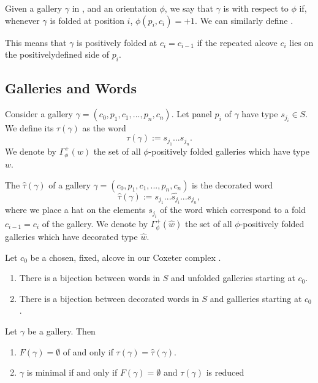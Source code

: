 \documentclass[11pt]{article}
\begin{document}
\begin{definition}
    Given a gallery $\gamma$ in \sg, and an orientation $\phi$, we say that $\gamma$ is  with respect to $\phi$ if, whenever $\gamma$ is folded at position $i$, $\phi(p_i,c_i)=+1$.  We can similarly define .
\end{definition}

This means that $\gamma$ is positively folded at $c_i=c_{i-1}$ if the repeated alcove $c_i$ lies on the positivelydefined side of $p_i$. 

\subsection{Galleries and Words}

\begin{definition}
    Consider a gallery $\gamma = (c_0,p_1,c_1,...,p_n,c_n)$. Let panel $p_i$ of $\gamma$ have type $s_{j_i}\in S$. We define its  $\tau(\gamma)$ as the word 
    \[\tau(\gamma):=s_{j_1}...s_{j_n}.\]
    We denote by $\Gamma_{\phi}^+(w)$ the set of all $\phi$-positively folded galleries which have type $w$. 
\end{definition}

\begin{definition}
    The  $\hat\tau(\gamma)$ of a gallery $\gamma = (c_0,p_1,c_1,...,p_n,c_n)$ is the decorated word
    \[\hat\tau(\gamma):= s_{j_1}...\hat{s_{j_i}}...s_{j_n},\]
    where we place a hat on the elements $s_{j_i}$ of the word which correspond to a fold $c_{i-1}=c_i$ of the gallery. We denote by $\Gamma_{\phi}^+(\hat{w})$ the set of all $\phi$-positively folded galleries which have decorated type $\hat{w}$.
\end{definition}

\begin{lemma}
    Let $c_0$ be a chosen, fixed, alcove in our Coxeter complex \sg. 
    \begin{enumerate}
        \item There is a bijection between words in $S$ and unfolded galleries starting at $c_0$.
        \item There is a bijection between decorated words in $S$ and gallleries starting at $c_0$. 
    \end{enumerate}
\end{lemma}

\begin{lemma}
    Let $\gamma$ be a gallery. Then
    \begin{enumerate}
        \item $F(\gamma)=\emptyset$ of and only if $\tau(\gamma)=\hat{\tau}(\gamma).$
        \item $\gamma$ is minimal if and only if $F(\gamma)=\emptyset$ and $\tau(\gamma)$ is reduced
    \end{enumerate}
\end{lemma}
\end{document}

